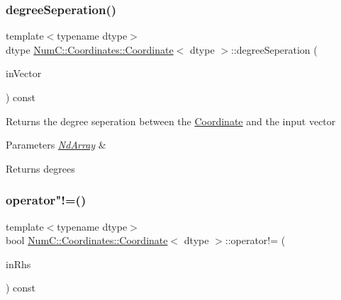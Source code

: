 \subsubsection{\texorpdfstring{degree\+Seperation()}{degreeSeperation()}\hspace{0.1cm}{\footnotesize\ttfamily [2/2]}}
{\footnotesize\ttfamily template$<$typename dtype$>$ \\
dtype \mbox{\hyperlink{class_num_c_1_1_coordinates_1_1_coordinate}{Num\+C\+::\+Coordinates\+::\+Coordinate}}$<$ dtype $>$\+::degree\+Seperation (\begin{DoxyParamCaption}\item[{const \mbox{\hyperlink{class_num_c_1_1_nd_array}{Nd\+Array}}$<$ dtype $>$ \&}]{in\+Vector }\end{DoxyParamCaption}) const\hspace{0.3cm}{\ttfamily [inline]}}

Returns the degree seperation between the \mbox{\hyperlink{class_num_c_1_1_coordinates_1_1_coordinate}{Coordinate}} and the input vector


\begin{DoxyParams}{Parameters}
{\em \mbox{\hyperlink{class_num_c_1_1_nd_array}{Nd\+Array}}} & \\
\hline
\end{DoxyParams}
\begin{DoxyReturn}{Returns}
degrees 
\end{DoxyReturn}
\mbox{\label{class_num_c_1_1_coordinates_1_1_coordinate_a470632051f16f26dc976f5d8d0c24ac5}} 
\subsubsection{\texorpdfstring{operator"!=()}{operator!=()}}
{\footnotesize\ttfamily template$<$typename dtype$>$ \\
bool \mbox{\hyperlink{class_num_c_1_1_coordinates_1_1_coordinate}{Num\+C\+::\+Coordinates\+::\+Coordinate}}$<$ dtype $>$\+::operator!= (\begin{DoxyParamCaption}\item[{const \mbox{\hyperlink{class_num_c_1_1_coordinates_1_1_coordinate}{Coordinate}}$<$ dtype $>$ \&}]{in\+Rhs }\end{DoxyParamCaption}) const\hspace{0.3cm}{\ttfamily [inline]}}


